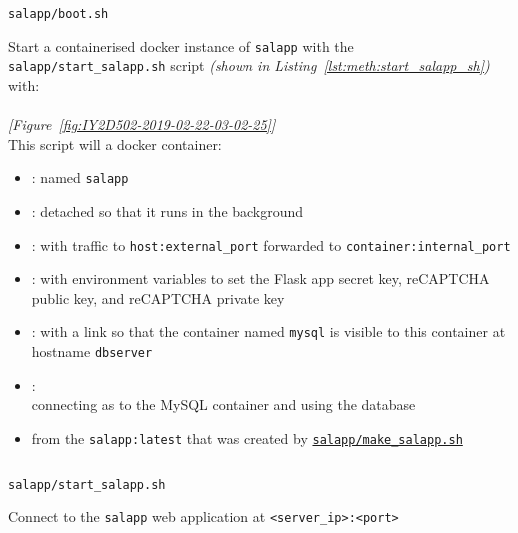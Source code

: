 \begin{methodology0}
\begin{methodology1}
\begin{listing}[H]
          \caption{\texttt{salapp/boot.sh}}
          \label{lst:meth:boot_sh}
        \end{listing}
      \pagebreak
      \item Start a containerised docker instance of \texttt{salapp} with the \texttt{salapp/start\_salapp.sh} script \textit{(shown in Listing~\ref{lst:meth:start_salapp_sh})} with:\\
        \\
        \textcolor{deep-gray}{\textit{[Figure~\ref{fig:IY2D502-2019-02-22-03-02-25}]}}\\
        This script will  a docker container:
        \begin{itemize}
          \item {}: named \texttt{salapp}
          \item {}: detached so that it runs in the background
          \item {}: with traffic to \texttt{host:external\_port} forwarded to \texttt{container:internal\_port}
          \item {}: with environment variables to set the Flask app secret key, reCAPTCHA public key, and reCAPTCHA private key
          \item {}: with a link so that the container named \texttt{mysql} is visible to this container at hostname \texttt{dbserver}
          \item {}:\\
            connecting as  to the MySQL container  and using the  database
          \item from the \texttt{salapp:latest} that was created by \hyperref[lst:meth:make_salapp_sh]{\texttt{salapp/make\_salapp.sh}}
        \end{itemize}
        \begin{listing}[H]
          \captionsetup{skip=\skiplistingcaptionlen}
          \inputminted[breakanywhere]{bash}{../uswacs-2-iy2d502-salapp/start_salapp.sh}
          \caption{\texttt{salapp/start\_salapp.sh}}
          \label{lst:meth:start_salapp_sh}
        \end{listing}
    \end{methodology1}
  \pagebreak
  \item Connect to the \texttt{salapp} web application at \texttt{<server\_ip>:<port>}

\end{methodology0}
